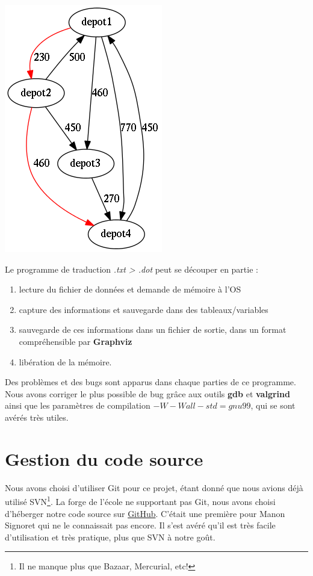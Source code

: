 \documentclass[12pt,a4paper]{report}
\begin{document}
\begin{center}
\includegraphics[scale=0.6]{output.png}
\end{center}

Le programme de traduction \textit{.txt > .dot} peut se découper en partie :


\begin{enumerate}
\item lecture du fichier de données et demande de mémoire à l'OS 
\item capture des informations et sauvegarde dans des tableaux/variables 
\item sauvegarde de ces informations dans un fichier de sortie, dans un format compréhensible par \textbf{Graphviz}
\item libération de la mémoire. 
\end{enumerate}

Des problèmes et des bugs sont apparus dans chaque parties de ce programme. Nous avons corriger le plus possible de bug grâce aux outils \textbf{gdb} et \textbf{valgrind} ainsi que les paramètres de compilation $-W -Wall -std=gnu99$, qui se sont avérés très utiles.

\section{Gestion du code source}
Nous avons choisi d'utiliser Git pour ce projet, \'{e}tant donn\'{e} que nous avions d\'{e}j\`{a} utilis\'{e} SVN\footnote{Il ne manque plus que Bazaar, Mercurial, etc!}. La forge de l'\'{e}cole ne supportant pas Git, nous avons choisi d'h\'{e}berger notre code source sur \href{https://github.com/Videl/Graph-Visualization-Manager}{GitHub}. C'était une première pour Manon Signoret qui ne le connaissait pas encore. Il s'est avéré qu'il est très facile d'utilisation et très pratique, plus que SVN à notre goût.
\end{document}
